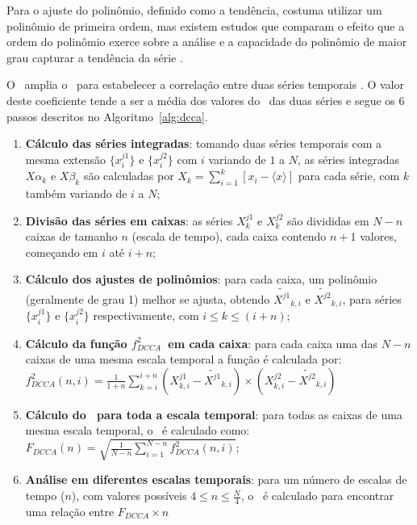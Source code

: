 Para o ajuste do polinômio, definido como a tendência, costuma utilizar um polinômio de primeira ordem, mas existem estudos que comparam o efeito que a ordem do polinômio exerce sobre a análise e a capacidade do polinômio de maior grau capturar a tendência da série \cite{huEffectTrendsDetrended2001}.  

O \dcca~amplia o \dfa~para estabelecer a correlação entre duas séries temporais \cite{Podobnik2008}. O valor deste coeficiente tende a ser a média dos valores do \dfa~das duas séries e segue os 6 passos descritos no Algoritmo~\ref{alg:dcca}.

\begin{algorithm} \caption{\dcca} \label{alg:dcca}
  \begin{enumerate}
    \item \textbf{Cálculo das séries integradas}: tomando duas séries temporais com a mesma extensão $\{x^{j1}_{i}\}$ e $\{x^{j2}_{i}\}$ com $i$ variando de $1$ a $N$,
          as séries integradas $X\alpha_{k}$ e $X\beta_{k}$ são calculadas por
          $X_{k} = \sum_{i=1}^{k}\left[x_{i} - \langle x \rangle \right] $ para cada série, com $k$ também variando de $i$ a $N$;
    \item \textbf{Divisão das séries em caixas}: as séries $X^{j1}_{k}$ e $X^{j2}_{k}$ são divididas em $N - n$ caixas de tamanho $n$ (escala de tempo), cada caixa contendo $n + 1$ valores, começando em $i$ até $i + n$;
    \item \textbf{Cálculo dos ajustes de polinômios}: para cada caixa, um polinômio (geralmente de grau 1) melhor se ajusta, obtendo
          $\widetilde{X^{j1}}_{k, i}$ e $\widetilde{X^{j2}}_{k, i}$,
          para séries $\{x^{j1}_{i}\}$ e $\{x^{j2}_{i}\}$ respectivamente,
          com $i \le k \le (i + n)$;
    \item \textbf{Cálculo da função $f_{DCCA}^{2}$~em cada caixa}: para cada caixa uma das $N - n$ caixas de uma mesma escala temporal a função é calculada por:\\[10pt]
     $f_{DCCA}^{2}(n, i) =
            \frac{1}{1+n} \sum_{k=i}^{i + n}(X^{j1}_{k,i}-\widetilde{X^{j1}}_{k, i}) \times (X^{j2}_{k,i}-\widetilde{X^{j2}}_{k, i})$
    \item \textbf{Cálculo do \dcca~para toda a escala temporal}: para todas as caixas de uma mesma escala temporal, o \dcca~é calculado como:\\[10pt]
          $F_{DCCA}(n) = \sqrt{\frac{1}{N - n} \sum_{i=1}^{N-n} f_{DCCA}^{2}(n, i)}$;
    \item \textbf{Análise em diferentes escalas temporais}: para um número de escalas de tempo ($n$), com valores possíveis $4 \le n \le \frac{N}{4}$, o \dcca~é calculado para encontrar uma relação entre $F_{DCCA} \times n$

\end{enumerate}
\end{algorithm}

